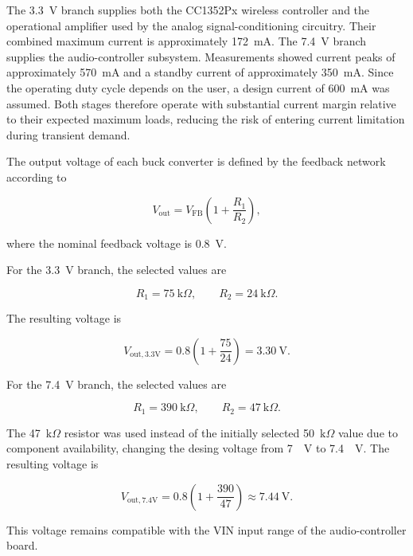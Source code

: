 The 3.3~V branch supplies both the CC1352Px wireless controller and the operational amplifier used by the analog signal-conditioning circuitry. Their combined maximum current is approximately 172~mA. The 7.4~V branch supplies the audio-controller subsystem. Measurements showed current peaks of approximately 570~mA and a standby current of approximately 350~mA. Since the operating duty cycle depends on the user, a design current of 600~mA was assumed. Both stages therefore operate with substantial current margin relative to their expected maximum loads, reducing the risk of entering current limitation during transient demand.

The output voltage of each buck converter is defined by the feedback network according to

\begin{equation}
V_{\mathrm{out}}
=
V_{\mathrm{FB}}
\left(
1+\frac{R_1}{R_2}
\right),
\end{equation}

where the nominal feedback voltage is 0.8~V.

For the 3.3~V branch, the selected values are

\begin{equation}
R_1 = 75~\mathrm{k}\Omega,
\qquad
R_2 = 24~\mathrm{k}\Omega.
\end{equation}

The resulting voltage is

\begin{equation}
V_{\mathrm{out,3.3V}}
=
0.8
\left(
1+\frac{75}{24}
\right)
=
3.30~\mathrm{V}.
\end{equation}

For the 7.4~V branch, the selected values are

\begin{equation}
R_1 = 390~\mathrm{k}\Omega,
\qquad
R_2 = 47~\mathrm{k}\Omega.
\end{equation}

The 47~$\mathrm{k}\Omega$ resistor was used instead of the initially selected 50~$\mathrm{k}\Omega$ value due to component availability, changing the desing voltage from 7~~V to 7.4~~V. The resulting voltage is

\begin{equation}
V_{\mathrm{out,7.4V}}
=
0.8
\left(
1+\frac{390}{47}
\right)
\approx
7.44~\mathrm{V}.
\end{equation}

This voltage remains compatible with the VIN input range of the audio-controller board.

